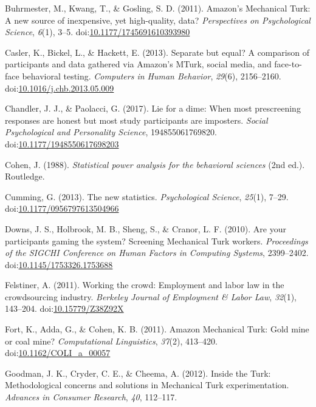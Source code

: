 \documentclass[english,man]{apa6}
\theoremstyle{definition}
\theoremstyle{definition}
\theoremstyle{definition}
\theoremstyle{remark}
\begin{document}
\hypertarget{ref-Buhrmester2011}{}
Buhrmester, M., Kwang, T., \& Gosling, S. D. (2011). Amazon's Mechanical
Turk: A new source of inexpensive, yet high-quality, data?
\emph{Perspectives on Psychological Science}, \emph{6}(1), 3--5.
doi:\href{https://doi.org/10.1177/1745691610393980}{10.1177/1745691610393980}

\hypertarget{ref-Casler2013}{}
Casler, K., Bickel, L., \& Hackett, E. (2013). Separate but equal? A
comparison of participants and data gathered via Amazon's MTurk, social
media, and face-to-face behavioral testing. \emph{Computers in Human
Behavior}, \emph{29}(6), 2156--2160.
doi:\href{https://doi.org/10.1016/j.chb.2013.05.009}{10.1016/j.chb.2013.05.009}

\hypertarget{ref-Chandler2017}{}
Chandler, J. J., \& Paolacci, G. (2017). Lie for a dime: When most
prescreening responses are honest but most study participants are
imposters. \emph{Social Psychological and Personality Science},
194855061769820.
doi:\href{https://doi.org/10.1177/1948550617698203}{10.1177/1948550617698203}

\hypertarget{ref-Cohen1988}{}
Cohen, J. (1988). \emph{Statistical power analysis for the behavioral
sciences} (2nd ed.). Routledge.

\hypertarget{ref-Cumming2013}{}
Cumming, G. (2013). The new statistics. \emph{Psychological Science},
\emph{25}(1), 7--29.
doi:\href{https://doi.org/10.1177/0956797613504966}{10.1177/0956797613504966}

\hypertarget{ref-Downs2010}{}
Downs, J. S., Holbrook, M. B., Sheng, S., \& Cranor, L. F. (2010). Are
your participants gaming the system? Screening Mechanical Turk workers.
\emph{Proceedings of the SIGCHI Conference on Human Factors in Computing
Systems}, 2399--2402.
doi:\href{https://doi.org/10.1145/1753326.1753688}{10.1145/1753326.1753688}

\hypertarget{ref-Felstiner2011}{}
Felstiner, A. (2011). Working the crowd: Employment and labor law in the
crowdsourcing industry. \emph{Berkeley Journal of Employment \& Labor
Law}, \emph{32}(1), 143--204.
doi:\href{https://doi.org/10.15779/Z38Z92X}{10.15779/Z38Z92X}

\hypertarget{ref-Fort2011}{}
Fort, K., Adda, G., \& Cohen, K. B. (2011). Amazon Mechanical Turk: Gold
mine or coal mine? \emph{Computational Linguistics}, \emph{37}(2),
413--420.
doi:\href{https://doi.org/10.1162/COLI_a_00057}{10.1162/COLI\_a\_00057}

\hypertarget{ref-Goodman2012}{}
Goodman, J. K., Cryder, C. E., \& Cheema, A. (2012). Inside the Turk:
Methodological concerns and solutions in Mechanical Turk
experimentation. \emph{Advances in Consumer Research}, \emph{40},
112--117.
\end{document}

